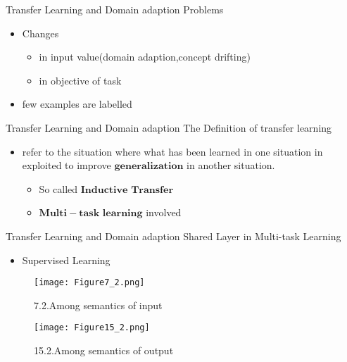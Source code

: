 
\begin{frame}{Transfer Learning and Domain adaption}
Problems
\begin{itemize}
  \item Changes
  \begin{itemize} %
    \item in input value(domain adaption,concept drifting)
    \item in objective of task
  \end{itemize}
  \item few examples are labelled
\end{itemize}
\end{frame}

\begin{frame}{Transfer Learning and Domain adaption}
The Definition of transfer learning
\begin{itemize}
  \item refer to the situation where what has been learned in one situation in exploited to improve $\bm{generalization} $ in another situation.
    \begin{itemize} %
    \item So called $\bm{Inductive}$ $\bm{Transfer}$
    \item $\bm{Multi-task}$ $\bm{learning}$ involved
  \end{itemize}

\end{itemize}
\end{frame}

\begin{frame}{Transfer Learning and Domain adaption}
Shared Layer in Multi-task Learning
\begin{itemize}
\item Supervised Learning
\end{itemize}
\begin{figure}[htbp]
\centering
\begin{minipage}[t]{0.3\textwidth}
\centering
\texttt{[image: Figure7\_2.png]}
\caption{7.2.Among semantics of input}
\end{minipage}
\begin{minipage}[t]{0.3\textwidth}
\centering
\texttt{[image: Figure15\_2.png]}
\caption{15.2.Among semantics of output}
\end{minipage}
\end{figure}
\end{frame}

